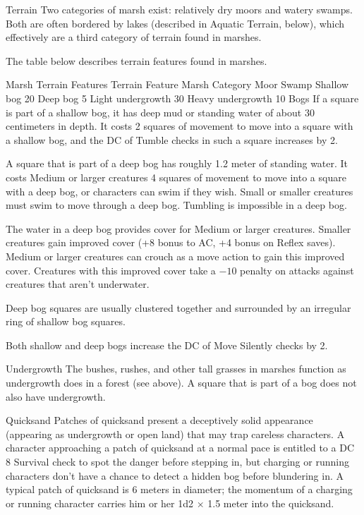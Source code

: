 \Marsh Terrain
Two categories of marsh exist: relatively dry moors and watery swamps. Both are often bordered by lakes (described in Aquatic Terrain, below), which effectively are a third category of terrain found in marshes.

The table below describes terrain features found in marshes.

Marsh Terrain Features
Terrain Feature	Marsh Category
Moor	Swamp
Shallow bog	20%
Deep bog	5%
Light undergrowth	30%
Heavy undergrowth	10%
Bogs
If a square is part of a shallow bog, it has deep mud or standing water of about 30 centimeters in depth. It costs 2 squares of movement to move into a square with a shallow bog, and the DC of Tumble checks in such a square increases by 2.

A square that is part of a deep bog has roughly 1.2 meter of standing water. It costs Medium or larger creatures 4 squares of movement to move into a square with a deep bog, or characters can swim if they wish. Small or smaller creatures must swim to move through a deep bog. Tumbling is impossible in a deep bog.

The water in a deep bog provides cover for Medium or larger creatures. Smaller creatures gain improved cover (+8 bonus to AC, +4 bonus on Reflex saves). Medium or larger creatures can crouch as a move action to gain this improved cover. Creatures with this improved cover take a $-10$ penalty on attacks against creatures that aren’t underwater.

Deep bog squares are usually clustered together and surrounded by an irregular ring of shallow bog squares.

Both shallow and deep bogs increase the DC of Move Silently checks by 2.

Undergrowth
The bushes, rushes, and other tall grasses in marshes function as undergrowth does in a forest (see above). A square that is part of a bog does not also have undergrowth.

Quicksand
Patches of quicksand present a deceptively solid appearance (appearing as undergrowth or open land) that may trap careless characters. A character approaching a patch of quicksand at a normal pace is entitled to a DC 8 Survival check to spot the danger before stepping in, but charging or running characters don’t have a chance to detect a hidden bog before blundering in. A typical patch of quicksand is 6 meters in diameter; the momentum of a charging or running character carries him or her 1d2 $\times$ 1.5 meter into the quicksand.

